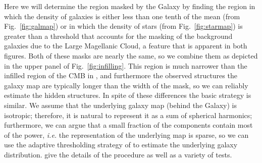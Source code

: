 \documentclass[useAMS,usenatbib]{mn2e}
\begin{document}
Here we will determine the region masked by the Galaxy by finding the
region in which the density of galaxies is either less than one tenth
of the mean (from Fig.~\ref{fig:galmap}) or in which the density of
stars (from Fig.~\ref{fig:starmap}) is greater than a threshold that
accounts for the masking of the background galaxies due to the Large
Magellanic Cloud, a feature that is apparent in both figures.  Both of
these masks are nearly the same, so we combine them as depicted in the
upper panel of Fig.~\ref{fig:infilling}.  This region is much narrower
than the infilled region of the CMB in \citet{2008StMet...5..289A},
and furthermore the observed structures the galaxy map are typically
longer than the width of the mask, so we can reliably estimate the
hidden structures.  In spite of these differences the basic strategy
is similar.  We assume that the underlying galaxy map (behind the
Galaxy) is isotropic; therefore, it is natural to represent it as a
sum of spherical harmonics; furthermore, we can argue that a small
fraction of the components contain most of the power, {\em i.e.} the
representation of the underlying map is sparse, so we can use the
adaptive thresholding strategy of \citet{2007ITIP...16.2675B} to
estimate the underlying galaxy distribution.  \citet{2016AntolInfill}
give the details of the procedure as well as a variety of tests.
\end{document}
